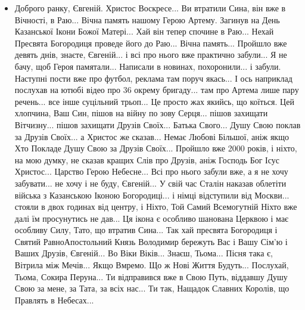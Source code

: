 \begin{itemize}
\item Доброго ранку, Євгеній. Христос Воскресе... Ви втратили Сина, він вже в
				Вічності, в Раю... Вічна память нашому Герою Артему. Загинув на День
				Казанської Ікони Божої Матері... Хай він тепер спочине в Раю... Нехай
				Пресвята Богородиця проведе його до Раю... Вічна память... Пройшло вже
				девять днів, знаєте, Євгеній... і всі про нього вже практично забули...
				Я не бачу, щоб Героя памятали... Написали в новинах, похоронили... і
				забули. Наступні пости вже про футбол, реклама там поруч якась... І ось
				наприклад послухав на ютюбі відео про 36 окрему бригаду... там про
				Артема лише пару речень... все інше суцільний трьоп... Це просто жах
				якийсь, що коїться. Цей хлопчина, Ваш Син, пішов на війну по зову
				Серця... пішов захищати Вітчизну... пішов захищати Друзів Своїх...
				Батька Свого... Душу Свою поклав за Друзів Своїх... а Христос же
				сказав... Немає Любові Більшої, аніж якщо Хто Покладе Душу Свою за
				Друзів Своїх... Пройшло вже 2000 років, і ніхто, на мою думку, не
				сказав кращих Слів про Друзів, аніж Господь Бог Ісус Христос... Царство
				Герою Небесне... Всі про нього забули вже, а я не хочу забувати... не
				хочу і не буду, Євгеній... У свій час Сталін наказав облетіти війська з
				Казанською Іконою Богородиці... і німці відступили від Москви... стояли
				в двох годинах від центру, і Ніхто, Той Самий Всемогутній Ніхто вже
				далі їм просунутись не дав... Ця ікона є особливо шанована Церквою і
				має особливу Силу, Тато, що втратив Сина... Так хай пресвята Богородиця
				і Святий РавноАпостольний Князь Володимир бережуть Вас і Вашу Сім'ю і
				Ваших Друзів, Євгеній... Во Віки Віків... Знаєш, Тьома... Пісня така є,
				Вітрила між Мечів... Якщо Вмремо. Що ж Нові Життя Будуть... Послухай,
				Тьома, Сокира Перуна... Ти відправився вже в Свою Путь, віддавшу Душу
				Свою за мене, за Тата, за всіх нас... Ти так, Нащадок Славних Королів,
				що Правлять в Небесах...


\end{itemize}
